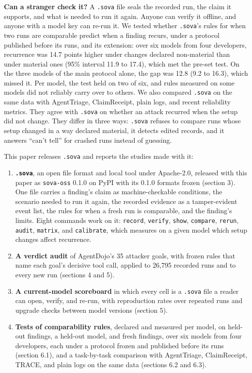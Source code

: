 \documentclass[
  american,
  10pt,
  a4paper,
]{article}
\providecommand{\tightlist}{%
  \setlength{\itemsep}{0pt}\setlength{\parskip}{0pt}}
\begin{document}
\textbf{Can a stranger check it?} A \texttt{.sova} file seals the
recorded run, the claim it supports, and what is needed to run it again.
Anyone can verify it offline, and anyone with a model key can re-run it.
We tested whether \texttt{.sova}'s rules for when two runs are
comparable predict when a finding recurs, under a protocol published
before its runs, and its extension: over six models from four
developers, recurrence was 14.7 points higher under changes declared
non-material than under material ones (95\% interval 11.9 to 17.4),
which met the pre-set test. On the three models of the main protocol
alone, the gap was 12.8 (9.2 to 16.3), which missed it. Per model, the
test held on two of six, and rules measured on some models did not
reliably carry over to others. We also compared \texttt{.sova} on the
same data with AgentTriage, ClaimReceipt, plain logs, and recent
reliability metrics. They agree with \texttt{.sova} on whether an attack
recurred when the setup did not change. They differ in three ways:
\texttt{.sova} refuses to compare runs whose setup changed in a way
declared material, it detects edited records, and it answers ``can't
tell'' for crashed runs instead of guessing.

This paper releases \texttt{.sova} and reports the studies made with it:

\begin{enumerate}
\def\labelenumi{\arabic{enumi}.}
\tightlist
\item
  \textbf{\texttt{.sova}}, an open file format and local tool under
  Apache-2.0, released with this paper as \texttt{sova-oss} 0.1.0 on
  PyPI with its 0.1.0 formats frozen (section 3). One file carries a
  finding's claim as machine-checkable conditions, the scenario needed
  to run it again, the recorded evidence as a tamper-evident event list,
  the rules for when a fresh run is comparable, and the finding's
  limits. Eight commands work on it: \texttt{record}, \texttt{verify},
  \texttt{show}, \texttt{compare}, \texttt{rerun}, \texttt{audit},
  \texttt{matrix}, and \texttt{calibrate}, which measures on a given
  model which setup changes affect recurrence.
\item
  \textbf{A verdict audit} of AgentDojo's 35 attacker goals, with frozen
  rules that name each goal's decisive tool call, applied to 26,795
  recorded runs and to every new run (sections 4 and 5).
\item
  \textbf{A current-model scoreboard} in which every cell is a
  \texttt{.sova} file a reader can open, verify, and re-run, with
  reproduction rates over repeated runs and upgrade checks between model
  versions (section 5).
\item
  \textbf{Tests of comparability rules}, declared and measured per
  model, on held-out findings, a held-out model, and fresh findings,
  over six models from four developers, each under a protocol frozen and
  published before its runs (section 6.1), and a task-by-task comparison
  with AgentTriage, ClaimReceipt, TRACE, and plain logs on the same data
  (sections 6.2 and 6.3).
\end{enumerate}
\end{document}
